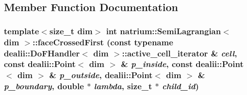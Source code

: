\subsection{Member Function Documentation}
\hypertarget{classnatrium_1_1SemiLagrangian_a3b096afb85f7ea3782e03ba36b973088}{
\subsubsection[{faceCrossedFirst}]{\setlength{\rightskip}{0pt plus 5cm}template$<$size\_\-t dim$>$ int {\bf natrium::SemiLagrangian}$<$ dim $>$::faceCrossedFirst (const typename dealii::DoFHandler$<$ dim $>$::active\_\-cell\_\-iterator \& {\em cell}, \/  const dealii::Point$<$ dim $>$ \& {\em p\_\-inside}, \/  const dealii::Point$<$ dim $>$ \& {\em p\_\-outside}, \/  dealii::Point$<$ dim $>$ \& {\em p\_\-boundary}, \/  double $\ast$ {\em lambda}, \/  size\_\-t $\ast$ {\em child\_\-id})}}
\label{classnatrium_1_1SemiLagrangian_a3b096afb85f7ea3782e03ba36b973088}


